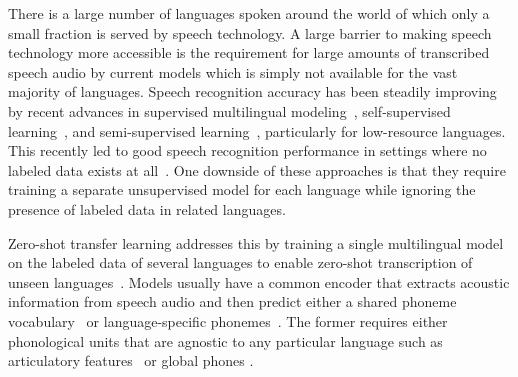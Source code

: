 \documentclass{article}
\newcommand{\ma}[1]{{\color{orange}#1}}
\begin{document}

There is a large number of languages spoken around the world of which only a small fraction is served by speech technology. 
A large barrier to making speech technology more accessible is the requirement for large amounts of transcribed speech audio by current models which is simply not available for the vast majority of languages.
Speech recognition accuracy has been steadily improving by recent advances in supervised multilingual modeling~\cite{dalmia2018sequence, pratap2020massively}, self-supervised learning~\cite{oord2018cpc,chung2018speech2vec,chung2019unsupervised,baevski2020wav2vec, hsu2021hubert}, and semi-supervised learning~\cite{synnaeve2019end, xu2020iterative, likhomanenko2020slimipl, xu2021self, park2020improved}, particularly for low-resource languages.
This recently led to good speech recognition performance in settings where no labeled data exists at all~\cite{liu2018completely,chen2019completely,baevski2021unsupervised}.
One downside of these approaches is that they require training a separate unsupervised model for each language while ignoring the presence of labeled data in related languages.

Zero-shot transfer learning addresses this by training a single multilingual model on the labeled data of several languages to enable zero-shot transcription of unseen languages~\cite{gaozero, li2020universal, jacobs2021multilingual, yan2021differentiable, li2020universal, li2020towards}.
Models usually have a common encoder that extracts acoustic information from speech audio and then predict either a shared phoneme vocabulary~\cite{li2020universal, gaozero} or language-specific phonemes~\cite{dalmia2018sequence, li2020towards, winata2020adapt}. 
The former requires either phonological units that are agnostic to any particular language such as articulatory features~\cite{li2020towards} or global phones \cite{schultz2002globalphone, li2020universal}. %
\end{document}
